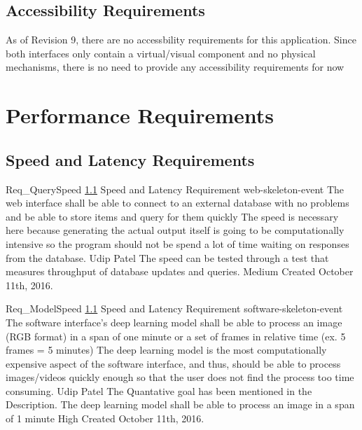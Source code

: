 \documentclass{scrreprt}
\begin{document}
\subsection{Accessibility Requirements}
\label{req-accessibility}
As of Revision 9, there are no accessbility requirements for this application.
Since both interfaces only contain a virtual/visual component and no physical
mechanisms, there is no need to provide any accessibility requirements for now

\section{Performance Requirements}

\subsection{Speed and Latency Requirements}
\label{req-speed-latency}

\requirement
{Req_QuerySpeed}
{\ref{req-speed-latency} Speed and Latency Requirement}
{web-skeleton-event}
{The web interface shall be able to connect to an external database with no problems and be able to store items and query for them quickly }
{The speed is necessary here because generating the actual output itself is going to be computationally intensive so the program should not be spend a lot of time waiting on responses from the database.}
{Udip Patel}
{The speed can be tested through a test that measures throughput of database updates and queries.}
{Medium}
{Created October 11th, 2016.}

\requirement
{Req_ModelSpeed}
{\ref{req-speed-latency} Speed and Latency Requirement}
{software-skeleton-event}
{The software interface's deep learning model shall be able to process an image (RGB format) in a span of one minute or a set of frames in relative time (ex. 5 frames = 5 minutes)}
{The deep learning model is the most computationally expensive aspect of the software interface, and thus, should be able to process images/videos quickly enough so that the user does not find the process too time consuming.}
{Udip Patel}
{The Quantative goal has been mentioned in the Description. The deep learning model shall be able to process an image in a span of 1 minute}
{High}
{Created October 11th, 2016.}
\end{document}
